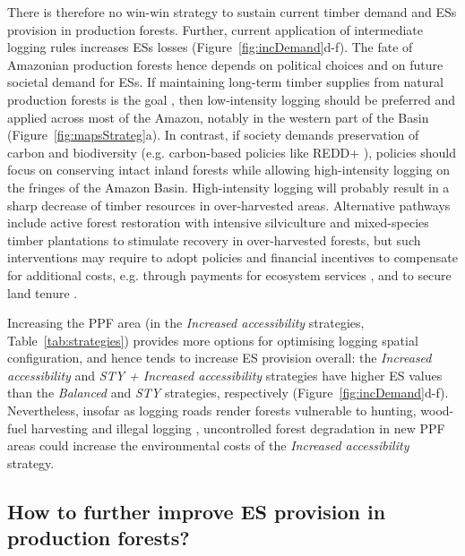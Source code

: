 \documentclass[12pt]{article}
\begin{document}
There is therefore no win-win strategy to sustain current timber demand and ESs provision in production forests. Further, current application of intermediate logging rules increases ESs losses (Figure~\ref{fig:incDemand}d-f). The fate of Amazonian production forests hence depends on political choices and on future societal demand for ESs. If maintaining long-term timber supplies from natural production forests is the goal \cite{Zarin2007}, then low-intensity logging should be preferred and applied across most of the Amazon, notably in the western part of the Basin (Figure~\ref{fig:mapsStrateg}a). In contrast, if society demands preservation of carbon and biodiversity (e.g. carbon-based policies like REDD+ \cite{Stickler2009}), policies should focus on conserving intact inland forests while allowing high-intensity logging on the fringes of the Amazon Basin. High-intensity logging will probably result in a sharp decrease of timber resources in over-harvested areas. Alternative pathways include active forest restoration with intensive silviculture and mixed-species timber plantations \cite{Lamb2005} to stimulate recovery in over-harvested forests, but such interventions may require to adopt policies and financial incentives to compensate for additional costs, e.g. through payments for ecosystem services \cite{Salzman2018}, and to secure land tenure \cite{Smith2006}.

Increasing the PPF area (in the \textit{Increased accessibility} strategies, Table~\ref{tab:strategies}) provides more options for optimising logging spatial configuration, and hence tends to increase ES provision overall: the \textit{Increased accessibility}  and \textit{STY  + Increased accessibility} strategies have higher ES values than the \textit{Balanced} and \textit{STY} strategies, respectively (Figure~\ref{fig:incDemand}d-f). Nevertheless, insofar as logging roads render forests vulnerable to hunting, wood-fuel harvesting and illegal logging \cite{Laurance2009a}, uncontrolled forest degradation in new PPF areas could increase the environmental costs of the \textit{Increased accessibility} strategy.
 
\subsection*{How to further improve ES provision in production forests?}
\end{document}

